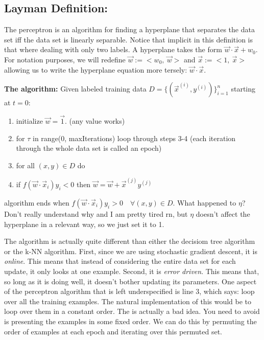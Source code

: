 \documentclass[10pt]{article}
\begin{document}
	\subsection*{Layman Definition:}
		The perceptron is an algorithm for finding a hyperplane that separates the data set iff the data set
		is linearly separable. Notice that implicit in this definition is that where dealing with only two labels. 
		A hyperplane takes the form $\vec w  \cdot \vec x + w_0$. For notation purposes, we will redefine
		$\vec w := <w_0, \ \vec w>$ and $\vec x := <1, \ \vec x>$ allowing us to write the hyperplane equation 
		more tersely: $\vec w \cdot \vec x$. \\

		\begin{addmargin}[1em]{2em}
		\textbf{The algorithm:} Given labeled training data $D = \{ (\vec x^{(i)}, y^{(i) }) \}_{i=1}^{n}$ \break starting
		at $t = 0$:
		\begin{enumerate}
			\item initialize $\vec w = \vec 1$. (any value works)
			\item for $\tau$ in range(0, maxIterations) loop through steps 3-4 (each iteration through the whole data 
				set is called an epoch)
			\item for all $(x,y) \in D$ do 
			\item if $f(\vec w \cdot \vec x_i)y_i < 0$ then 
				$\vec w = \vec w+ \vec x^{(j)} y^{(j)} $
		\end{enumerate}
		algorithm ends when $f(\vec w \cdot \vec x_i)y_i > 0 \quad \forall (x,y) \in D$. What happened to $\eta$?
		Don't really understand why and I am pretty tired rn, but $\eta$ doesn't affect the hyperplane in a 
		relevant way, so we just set it to 1. \\
		\end{addmargin}	

		\noindent The algorithm is actually quite different than either the decisiom tree algorithm or the k-NN algorithm. 
		First, since we are using stochastic gradient descent, it is \textit{online}. This means that instead of considering 
		the entire data set for each update, it only looks at one example. Second, it is \textit{error driven}. This means that, 
		so long as it is doing well, it doesn't bother updating its parameters. One aspect of the perceptron algorithm that is 
		left underspecified is line 3, which says: loop over all the training examples. The natural implementation of this would 
		be to loop over them in a constant order. The is actually a bad idea. You need to avoid is presenting the examples in
		some fixed order. We can do this by permuting the order of examples at each epoch and iterating over this permuted
		set. 
		
\end{document}
